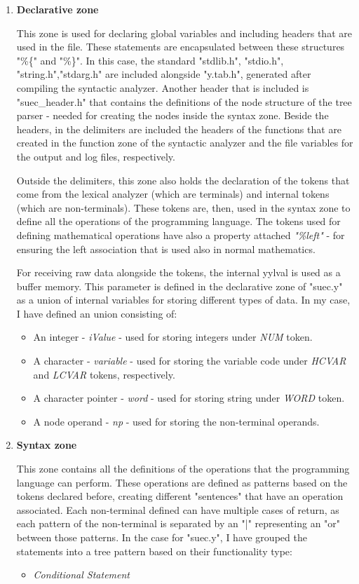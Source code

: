\documentclass[12pt,a4paper,twoside]{report}
\begin{document}
\begin{enumerate}
	\item \textbf{Declarative zone}
	
	This zone is used for declaring global variables and including headers that are used in the file. These statements are encapsulated between these structures "\%\{" and "\%\}". In this case, the standard "stdlib.h", "stdio.h", "string.h","stdarg.h" are included alongside "y.tab.h", generated after compiling the syntactic analyzer. Another header that is included is "suec\_header.h" that contains the definitions of the node structure of the tree parser - needed for creating the nodes inside the syntax zone. Beside the headers, in the delimiters are included the headers of the functions that are created in the function zone of the syntactic analyzer and the file variables for the output and log files, respectively. 
	
	Outside the delimiters, this zone also holds the declaration of the tokens that come from the lexical analyzer (which are terminals) and internal tokens (which are non-terminals). These tokens are, then, used in the syntax zone to define all the operations of the programming language. The tokens used for defining mathematical operations have also a property attached \textit{"\%left"} - for ensuring the left association that is used also in normal mathematics. 
	
	For receiving raw data alongside the tokens, the internal yylval is used as a buffer memory. This parameter is defined in the declarative zone of "suec.y" as a union of internal variables for storing different types of data. In my case, I have defined an union consisting of:
	\begin{itemize}
		\item An integer - \textit{iValue} - used for storing integers under \textit{NUM} token.
		\item A character - \textit{variable} - used for storing the variable code under \textit{HCVAR} and \textit{LCVAR} tokens, respectively.
		\item A character pointer - \textit{word} - used for storing string under \textit{WORD} token.
		\item A node operand - \textit{np} - used for storing the non-terminal operands.
	\end{itemize}
	
	\item \textbf{Syntax zone}
	
	This zone contains all the definitions of the operations that the programming language can perform. These operations are defined as patterns based on the tokens declared before, creating different "sentences" that have an operation associated. Each non-terminal defined can have multiple cases of return, as each pattern of the non-terminal is separated by an "|" representing an "or" between those patterns. In the case for "suec.y", I have grouped the statements into a tree pattern based on their functionality type:
	\begin{itemize}
	\item \textit{Conditional Statement}
	

\end{itemize}
\end{enumerate}
\end{document}
